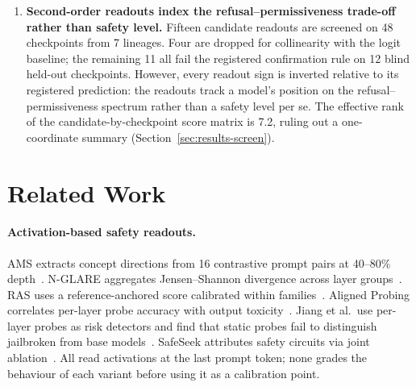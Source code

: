 \documentclass[11pt,letterpaper]{article}
\begin{document}
\begin{enumerate}
\item \textbf{Second-order readouts index the refusal--permissiveness trade-off rather than safety level.} Fifteen candidate readouts are screened on 48 checkpoints from 7 lineages. Four are dropped for collinearity with the logit baseline; the remaining 11 all fail the registered confirmation rule on 12 blind held-out checkpoints. However, every readout sign is inverted relative to its registered prediction: the readouts track a model's position on the refusal--permissiveness spectrum rather than a safety level per se. The effective rank of the candidate-by-checkpoint score matrix is 7.2, ruling out a one-coordinate summary (Section~\ref{sec:results-screen}).
\end{enumerate}


\section{Related Work}
\label{sec:related}

\paragraph{Activation-based safety readouts.}
AMS extracts concept directions from 16 contrastive prompt pairs at 40--80\% depth~\citep{Messenger2026}. N-GLARE aggregates Jensen--Shannon divergence across layer groups~\citep{Lin2025}. RAS uses a reference-anchored score calibrated within families~\citep{Huang2026}. Aligned Probing correlates per-layer probe accuracy with output toxicity~\citep{Waldis2025}. Jiang et al.\ use per-layer probes as risk detectors and find that static probes fail to distinguish jailbroken from base models~\citep{Jiang2026}. SafeSeek attributes safety circuits via joint ablation~\citep{Yu2026}. All read activations at the last prompt token; none grades the behaviour of each variant before using it as a calibration point.
\end{document}
